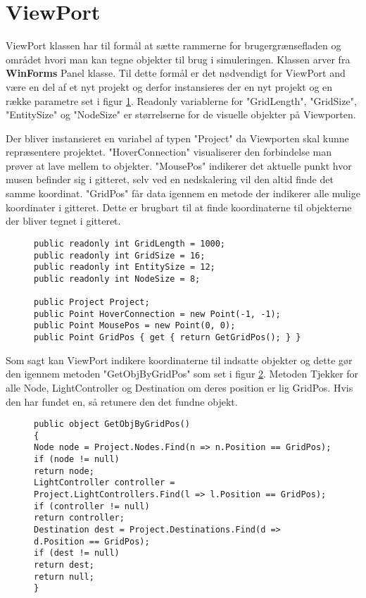 \section{ViewPort}\label{ViewPort}

ViewPort klassen har til formål at sætte rammerne for brugergrænsefladen og området hvori man kan tegne objekter til brug i simuleringen. Klassen arver fra \textbf{WinForms} Panel klasse. Til dette formål er det nødvendigt for ViewPort and være en del af et nyt projekt og derfor instansieres der en nyt projekt og en række parametre set i figur \ref{ViewportParameters}. Readonly variablerne for "GridLength", "GridSize", "EntitySize" og "NodeSize" er størrelserne for de visuelle objekter på Viewporten.

\vspace{5mm}

Der bliver instansieret en variabel af typen "Project" da Viewporten skal kunne repræsentere projektet. "HoverConnection" visualiserer den forbindelse man prøver at lave mellem to objekter. "MousePos" indikerer det aktuelle punkt hvor musen befinder sig i gitteret, selv ved en nedskalering vil den altid finde det samme koordinat. "GridPos" får data igennem en metode der indikerer alle mulige koordinater i gitteret. Dette er brugbart til at finde koordinaterne til objekterne der bliver tegnet i gitteret.

\begin{figure}[H]
\begin{lstlisting}
public readonly int GridLength = 1000;
public readonly int GridSize = 16;
public readonly int EntitySize = 12;
public readonly int NodeSize = 8;

public Project Project;
public Point HoverConnection = new Point(-1, -1);
public Point MousePos = new Point(0, 0);
public Point GridPos { get { return GetGridPos(); } }
\end{lstlisting}
\caption{}
\label{ViewportParameters}
\end{figure}

Som sagt kan ViewPort indikere koordinaterne til indsatte objekter og dette gør den igennem metoden "GetObjByGridPos" som set i figur \ref{ViewportGetObjByGridPos}. Metoden Tjekker for alle Node, LightController og Destination om deres position er lig GridPos. Hvis den har fundet en, så retunere den det fundne objekt.

\begin{figure}
\begin{lstlisting}
public object GetObjByGridPos()
{
Node node = Project.Nodes.Find(n => n.Position == GridPos);
if (node != null)
return node;
LightController controller = Project.LightControllers.Find(l => l.Position == GridPos);
if (controller != null)
return controller;
Destination dest = Project.Destinations.Find(d => d.Position == GridPos);
if (dest != null)
return dest;
return null;
}
\end{lstlisting}
\caption{}
\label{ViewportGetObjByGridPos}
\end{figure}
